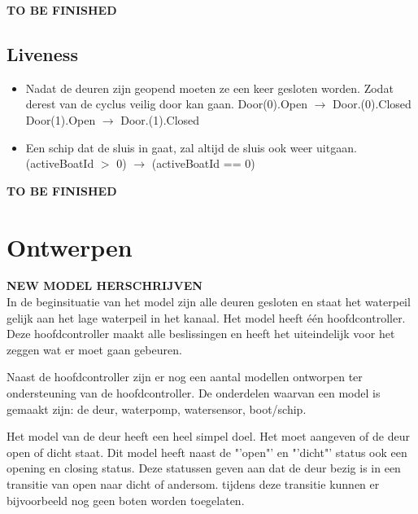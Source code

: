 \documentclass{article}
\begin{document}
\vskip2cm
{\Huge\color{red} \textbf{TO BE FINISHED}}
\vskip2cm

\subsection{Liveness}
\begin{itemize}

\item Nadat de deuren zijn geopend moeten ze een keer gesloten worden. Zodat derest van de cyclus veilig door kan gaan.
{\center Door(0).Open $\rightarrow$ Door.(0).Closed\\
Door(1).Open $\rightarrow$ Door.(1).Closed\\}

\vskip0.5cm
\item Een schip dat de sluis in gaat, zal altijd de sluis ook weer uitgaan.
{\center(activeBoatId $>$ 0) $\rightarrow$ (activeBoatId == 0)\\}
\end{itemize}

\vskip2cm
{\Huge\color{red} \textbf{TO BE FINISHED}}


\clearpage %
\section{Ontwerpen} %
{\huge\color{red} \textbf{NEW MODEL HERSCHRIJVEN}}\\
In de beginsituatie van het model zijn alle deuren gesloten en staat het waterpeil gelijk aan het lage waterpeil in het kanaal. Het model heeft één hoofdcontroller. Deze hoofdcontroller maakt alle beslissingen en heeft het uiteindelijk voor het zeggen wat er moet gaan gebeuren.

Naast de hoofdcontroller zijn er nog een aantal modellen ontworpen ter ondersteuning van de hoofdcontroller. De onderdelen waarvan een model is gemaakt zijn: de deur, waterpomp, watersensor, boot/schip.


\vskip0.5cm

Het model van de deur heeft een heel simpel doel. Het moet aangeven of de deur open of dicht staat. Dit model heeft naast de "'open"' en "'dicht"' status ook een opening en closing status. Deze statussen geven aan dat de deur bezig is in een transitie van open naar dicht of andersom. tijdens deze transitie kunnen er bijvoorbeeld nog geen boten worden toegelaten.

\vskip0.5cm
\end{document}
